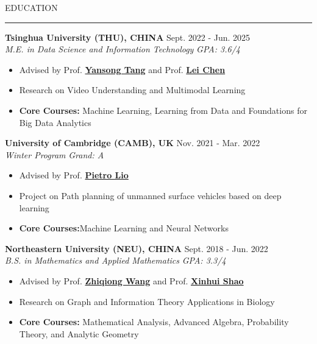 \documentclass{resume} %
\renewenvironment{rSection}[1]{
\sectionskip
\textcolor{TsinghuaPurple}{\MakeUppercase{#1}}
\sectionlineskip
\hrule
\begin{list}{}{
\setlength{\leftmargin}{0em}
}
\item[]
}{
\end{list}
}
\begin{document}
  


\begin{rSection}{Education}
{\bf Tsinghua University (THU), CHINA} \hfill {Sept. 2022 - Jun. 2025}
\\ 
\textit{M.E. in Data Science and Information Technology} \hfill{\textit {GPA: 3.6/4}}
\vspace{-7pt}
\begin{itemize}[itemsep=-5pt]
    \item Advised by Prof. \href{https://andytang15.github.io/}{\textbf{Yansong Tang}} and Prof. \href{https://leichenthu.github.io/}{\textbf{Lei Chen}} 
    \item Research on Video Understanding and Multimodal Learning
    \item \textbf{Core Courses:} {Machine Learning, Learning from Data and Foundations for Big Data Analytics}
\end{itemize}
{\bf University of Cambridge (CAMB), UK} \hfill {Nov. 2021 - Mar. 2022}
\\ 
\textit{Winter Program} \hfill{\textit {Grand: A}}
\vspace{-7pt}
\begin{itemize}[itemsep=-5pt]
    \item Advised by Prof. \href{https://scholar.google.com/citations?user=4YhNJBEAAAAJ&hl=en}{\textbf{Pietro Lio}}
    \item Project on Path planning of unmanned surface vehicles based on deep learning
    \item \textbf{Core Courses:}{Machine Learning and Neural Networks}
\end{itemize}
{\bf Northeastern University (NEU), CHINA} \hfill {Sept. 2018 - Jun. 2022}
\\ 
\textit{B.S. in Mathematics and Applied Mathematics} \hfill{\textit {GPA: 3.3/4}}
\vspace{-7pt}
\begin{itemize}[itemsep=-5pt]
    \item Advised by Prof. \href{https://scholar.google.com/citations?hl=zh-CN&user=QKrGYo4AAAAJ}{\textbf{Zhiqiong Wang}} and  Prof. \href{http://cos.neu.edu.cn/2019/0318/c3821a84520/page.htm}{\textbf{Xinhui Shao}}
    \item Research on Graph and Information Theory Applications in Biology
    \item \textbf{Core Courses:} {Mathematical Analysis, Advanced Algebra, Probability Theory, and Analytic Geometry}
\end{itemize}
\end{rSection}
\end{document}
